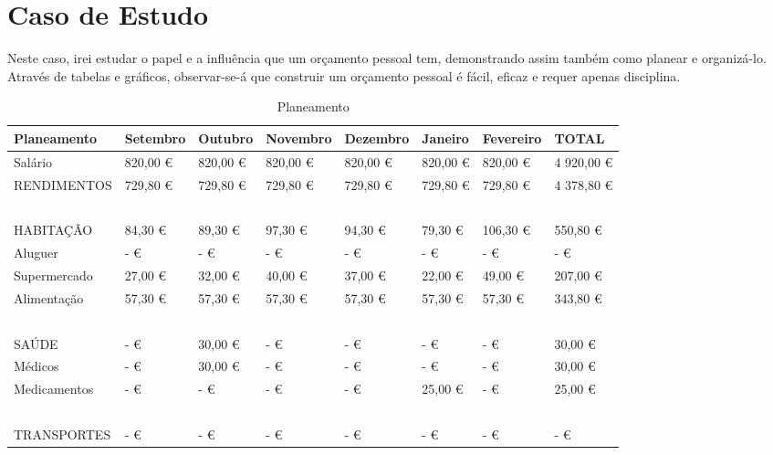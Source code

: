 \documentclass[a4paper,11pt]{article}
\begin{document}
\newpage
\section{Caso de Estudo}
Neste caso, irei estudar o papel e a influência que um orçamento pessoal tem, demonstrando assim também como planear e organizá-lo. Através de tabelas e gráficos, observar-se-á que construir um orçamento pessoal é fácil, eficaz e requer apenas disciplina.

\begin{table}[H]
    \begin{center}
    \caption{Planeamento}
    \begin{tabular}{|l|l|l|l|l|l|l|l|}
    \hline
        Planeamento & Setembro & Outubro & Novembro & Dezembro & Janeiro & Fevereiro & TOTAL \\ \hline
        Salário & 820,00 €  & 820,00 €  & 820,00 €  & 820,00 €  & 820,00 €  & 820,00 €  &  4 920,00  €  \\ \hline
        RENDIMENTOS & 729,80 €  & 729,80 €  & 729,80 €  & 729,80 €  & 729,80 €  & 729,80 €  &  4 378,80  €  \\ \hline
        ~ & ~ & ~ & ~ & ~ & ~ & ~ & ~ \\ \hline
        HABITAÇÃO &  84,30  €  &  89,30  €  &  97,30  €  &  94,30  €  &  79,30  €  &  106,30  €  &  550,80  €  \\ \hline
        Aluguer &  -    €  &  -    €  &  -    €  &  -    €  &  -    €  &  -    €  &  -    €  \\ \hline
        Supermercado &  27,00  €  &  32,00  €  &  40,00  €  &  37,00  €  &  22,00  €  &  49,00  €  &  207,00  €  \\ \hline
        Alimentação &  57,30  €  &  57,30  €  &  57,30  €  &  57,30  €  &  57,30  €  &  57,30  €  &  343,80  €  \\ \hline
        ~ & ~ & ~ & ~ & ~ & ~ & ~ & ~ \\ \hline
        SAÚDE &  -    €  &  30,00  €  &  -    €  &  -    €  &  -    €  &  -    €  &  30,00  €  \\ \hline
        Médicos &  -    €  &  30,00  €  &  -    €  &  -    €  & -  €  &  -    €  &  30,00  €  \\ \hline
        Medicamentos &  -    €  &  -    €  &  -    €  &  -    €  &  25,00  €  &  -    €  &  25,00  €  \\ \hline
        ~ & ~ & ~ & ~ & ~ & ~ & ~ & ~ \\ \hline
        TRANSPORTES &  -    €  &  -    €  &  -    €  &  -    €  &  -    €  &  -    €  &  -    €  \\ \hline

\end{tabular}
\end{center}
\end{table}
\end{document}

